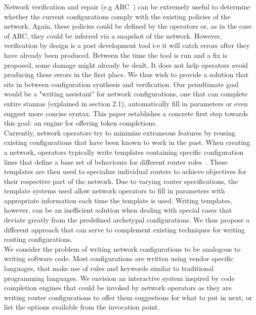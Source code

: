 Network verification and repair (e.g ARC~\cite{arc}) can be extremely useful to determine whether the current configurations comply with the existing policies of the network. Again, these policies could be defined by the operators or, as in the case of ARC, they could be inferred via a snapshot of the network. However, verification by design is a post development tool i-e it will catch errors after they have already been produced. Between the time the tool is run and a fix is proposed, some damage might already be dealt. It does not help operators avoid producing these errors in the first place. We thus wish to provide a solution that sits in between configuration synthesis and verification. Our penultimate goal would be a "writing assistant" for network configurations, one that can complete entire stanzas (explained in section 2.1), automatically fill in parameters or even suggest more concise syntax. This paper establishes a concrete first step towards this goal: an engine for offering token completions.\\


Currently, network operators try to minimize extraneous features by reusing existing configurations that have been known to work in the past. When creating a network, operators typically write templates containing specific configuration lines that define a base set of behaviours for different router roles~\cite{complexity}. These templates are then used to specialize individual routers to achieve objectives for their respective part of the network. Due to varying router specifications, the template systems used allow network operators to fill in parameters with appropriate information each time the template is used. Writing templates, however, can be an inefficient solution when dealing with special cases that deviate greatly from the predefined archetypal configurations. We thus propose a different approach that can serve to complement existing techniques for writing routing configurations.\\ 


We consider the problem of writing network configurations to be analogous to writing software code. Most configurations are written using vendor specific languages, that make use of rules and keywords similar to traditional programming languages. We envision an interactive system inspired by code completion engines that could be invoked by network operators as they are writing router configurations to offer them suggestions for what to put in next, or list the options available from the invocation point.\\ 


